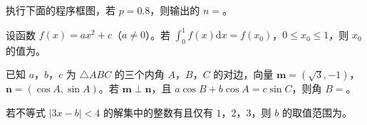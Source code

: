 \Needspace{0.4\textheight}
\begingroup
\renewenvironment{question}{\Needspace{0.4\textheight}}{}
\begin{question}
执行下面的程序框图，若 $p=0.8$，则输出的 $n=$\gkblank{}。
\nopagebreak[4]
\begin{center}\end{center}
\nopagebreak[4]
\end{question}
\endgroup
\begin{question}
设函数 $f(x)=ax^2+c$（$a\neq0$）。若 $\int_0^1f(x)\mathrm dx=f(x_0)$，$0\leqslant x_0\leqslant1$，则 $x_0$ 的值为\gkblank{}。

\end{question}
\begin{question}
已知 $a$，$b$，$c$ 为 $\triangle ABC$ 的三个内角 $A$，$B$，$C$ 的对边，向量 $\boldsymbol m=(\sqrt3,-1)$，$\boldsymbol n=(\cos A,\sin A)$。若 $\boldsymbol m\perp\boldsymbol n$，且 $a\cos B+b\cos A=c\sin C$，则角 $B=$\gkblank{}。

\end{question}
\begin{question}
若不等式 $|3x-b|<4$ 的解集中的整数有且仅有 $1$，$2$，$3$，则 $b$ 的取值范围为\gkblank{}。

\end{question}

